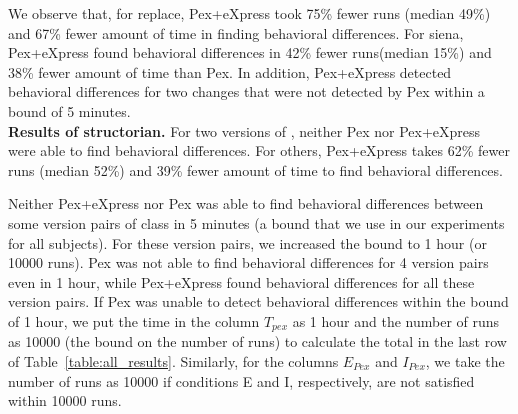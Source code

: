 We observe that, for replace, Pex+eXpress took 75\% fewer runs (median 49\%) and 67\% fewer amount of time in finding behavioral differences. 
For siena, Pex+eXpress found behavioral differences in 42\% fewer runs(median 15\%) and 38\% fewer amount of time than Pex. In addition, Pex+eXpress detected  behavioral differences for two changes that were not detected by Pex within a bound of 5 minutes.
\\ \textbf{Results of structorian.} 
 For two versions of , neither Pex nor Pex+eXpress were able to find behavioral differences. 
 For others, Pex+eXpress takes 62\% fewer runs (median 52\%) and 39\% fewer amount of time to find behavioral differences. 
 
 	Neither Pex+eXpress nor Pex was able to find behavioral differences between some version pairs of class  in 5 minutes (a bound that we use in our experiments for all subjects). For these version pairs, we increased the bound to 1 hour (or 10000 runs). Pex was not able to find behavioral differences for 4 version pairs even in 1 hour, while Pex+eXpress found behavioral differences for all these version pairs. If Pex was unable to detect behavioral differences within the bound of 1 hour, we put the time in the column $T_{pex}$ as 1 hour 
 	and the number of runs as 10000 (the bound on the number of runs) to calculate the total in the last row of Table~\ref{table:all_results}. Similarly, for the columns $E_{Pex}$ and $I_{Pex}$, we take the number of runs as 10000 if conditions E and I, respectively, are not satisfied within 10000 runs.
 	

